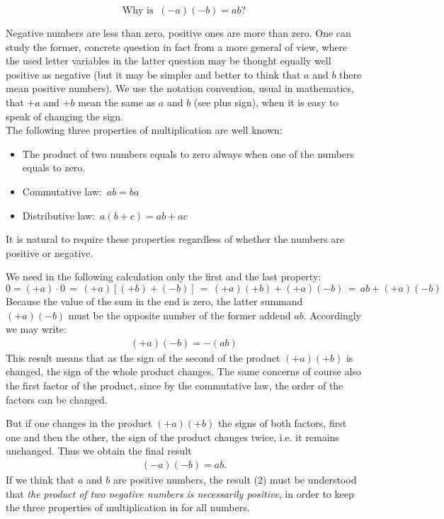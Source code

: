 \documentclass[12pt]{article}
\theoremstyle{definition}
\begin{document}
   

\textbf{}
$$\mbox{Why is}\;\; (-a)(-b) = ab?$$

Negative numbers are less than zero, positive ones are more than zero.  One can study the former, concrete question in fact from a more general  of view, where the used letter variables in the latter question may be thought equally well positive as negative (but it may be simpler and better to think that $a$ and $b$ there mean positive numbers).  We use the notation convention, usual in mathematics, that $+a$ and $+b$ mean the same as $a$ and $b$ (see plus sign), when it is easy to speak of changing the sign.\\

The following three properties of multiplication are well known:
\begin{itemize}
\item The product of two numbers equals to zero always when one of the numbers equals to zero.
\item Commutative law:\, $ab = ba$
\item Distributive law:\, $a(b\!+\!c) = ab\!+\!ac$
\end{itemize}

It is natural to require these properties regardless of whether the numbers are positive or negative.

We need in the following calculation only the first and the last property:
$$0 = (+a)\!\cdot\!0\, = \,(+a)[(+b)\!+\!(-b)]\, = \,(+a)(+b)\!+\!(+a)(-b)\, = \,ab\!+\!(+a)(-b)$$
Because the value of the sum in the end is zero, the latter summand $(+a)(-b)$ must be the opposite number of the former addend $ab$.  Accordingly we may write:
\begin{align}
(+a)(-b) = -(ab)
\end{align}
This result means that as the sign of the second  of the product $(+a)(+b)$ is changed, the sign of the whole product changes.  The same concerns of course also the first factor of the product, since by the commutative law, the order of the factors can be changed.

But if one changes in the product $(+a)(+b)$ the signs of both factors, first one and then the other, the sign of the product changes twice, i.e. it remains unchanged.  Thus we obtain the final result
\begin{align}
(-a)(-b) = ab.
\end{align}
If we think that $a$ and $b$ are positive numbers, the result (2) must be understood that {\em the product of two negative numbers is necessarily positive}, in order to keep the three properties of multiplication in  for all numbers.\\
\end{document}
